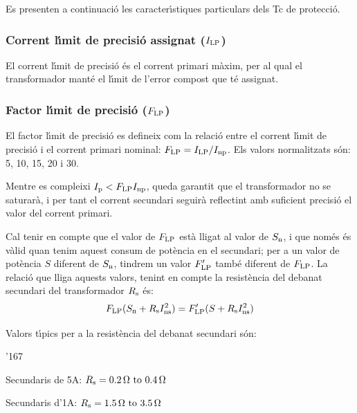 Es presenten a continuaci\'{o} les caracter\'{\i}stiques particulars dels Tc
de protecci\'{o}.

\subsubsection{Corrent l\'{\i}mit de precisi\'{o} assignat ($I_\mathrm{LP}$)}

El corrent
l\'{\i}mit de precisi\'{o} \'{e}s el corrent primari m\`{a}xim, per al qual el transformador mant\'{e} el l\'{\i}mit
de l'error compost que t\'{e} assignat.

\subsubsection{Factor l\'{\i}mit de precisi\'{o} ($F_\mathrm{LP}$) }

 El factor l\'{\i}mit de precisi\'{o}
es defineix com la relaci\'{o} entre el corrent l\'{\i}mit de precisi\'{o}
i el corrent primari nominal: $F_\mathrm{LP} = I_\mathrm{LP} /I_\mathrm{np}$.
Els valors normalitzats s\'{o}n: 5, 10, 15, 20 i 30.

Mentre es compleixi  $I_\mathrm{p}<F_\mathrm{LP} I_\mathrm{np}$, queda garantit
que el transformador no se saturar\`{a}, i per tant el corrent
secundari seguir\`{a} reflectint amb suficient precisi\'{o} el valor del
corrent primari.

Cal tenir en compte que el valor de $F_\mathrm{LP}$ est\`{a} lligat
 al valor de $S_\mathrm{n}$, i que nom\'{e}s \'{e}s v\`{a}lid
quan tenim aquest consum de  pot\`{e}ncia en el secundari; per a un
valor de pot\`{e}ncia $S$ diferent de $S_\mathrm{n}$, tindrem un valor
$F'_\mathrm{LP}$ tamb\'{e} diferent de  $F_\mathrm{LP}$. La relaci\'{o} que
lliga aquests valors, tenint en compte la resist\`{e}ncia del debanat
secundari del transformador  $R_\mathrm{s}$ \'{e}s:
\begin{equation}\label{eq:flp}
    F_\mathrm{LP} (S_\mathrm{n}+R_\mathrm{s}I_\mathrm{ns}^2) =
    F'_\mathrm{LP} (S+R_\mathrm{s}I_\mathrm{ns}^2)
\end{equation}

Valors t\'{\i}pics per a la resist\`{e}ncia del debanat secundari s\'{o}n:
\begin{dinglist}{'167}
    \item Secundaris de 5\unit{A}: $R\ped{s} = \SIrange{0,2}{0,4}{\ohm}$
    \item Secundaris d'1\unit{A}:  $R\ped{s} = \SIrange{1,5}{3,5}{\ohm}$
\end{dinglist}


